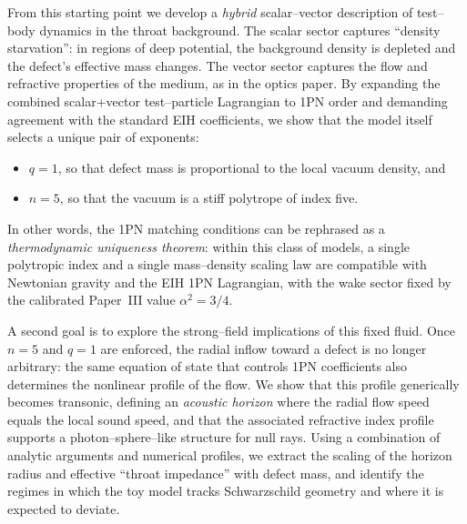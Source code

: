 \documentclass[11pt]{article}
\begin{document}
From this starting point we develop a \emph{hybrid} scalar--vector description
of test--body dynamics in the throat background.  The scalar sector captures
``density starvation'': in regions of deep potential, the background density
is depleted and the defect's effective mass changes.  The vector sector
captures the flow and refractive properties of the medium, as in the optics
paper.  By expanding the combined scalar+vector test--particle Lagrangian to
1PN order and demanding agreement with the standard EIH coefficients, we
show that the model itself selects a unique pair of exponents:
\begin{itemize}
  \item $q = 1$, so that defect mass is proportional to the local vacuum
  density, and
  \item $n = 5$, so that the vacuum is a stiff polytrope of index five.
\end{itemize}
In other words, the 1PN matching conditions can be rephrased as a
\emph{thermodynamic uniqueness theorem}: within this class of models, a
single polytropic index and a single mass--density scaling law are
compatible with Newtonian gravity and the EIH 1PN Lagrangian, with the
wake sector fixed by the calibrated Paper~III value \(\alpha^2=3/4\).

A second goal is to explore the strong--field implications of this fixed
fluid.  Once $n=5$ and $q=1$ are enforced, the radial inflow toward a defect
is no longer arbitrary: the same equation of state that controls 1PN
coefficients also determines the nonlinear profile of the flow.  We show
that this profile generically becomes transonic, defining an \emph{acoustic
horizon} where the radial flow speed equals the local sound speed, and that
the associated refractive index profile supports a photon--sphere--like
structure for null rays.  Using a combination of analytic arguments and
numerical profiles, we extract the scaling of the horizon radius and
effective ``throat impedance'' with defect mass, and identify the regimes in
which the toy model tracks Schwarzschild geometry and where it is expected
to deviate.
\end{document}
